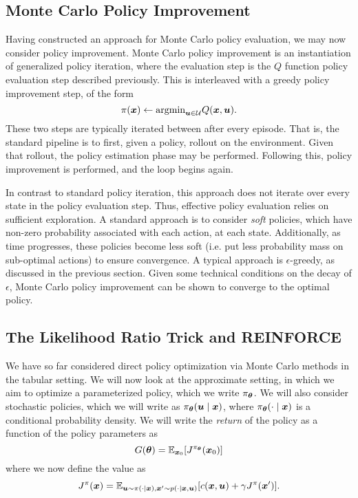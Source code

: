 \subsection{Monte Carlo Policy Improvement}

Having constructed an approach for Monte Carlo policy evaluation, we may now consider policy improvement. Monte Carlo policy improvement is an instantiation of generalized policy iteration, where the evaluation step is the $Q$ function policy evaluation step described previously. This is interleaved with a greedy policy improvement step, of the form
\begin{equation}
    \pi(\bm{x}) \gets \text{argmin}_{\bm{u}\in\mathcal{U}}Q(\bm{x},\bm{u}).
\end{equation}
These two steps are typically iterated between after every episode. That is, the standard pipeline is to first, given a policy, rollout on the environment. Given that rollout, the policy estimation phase may be performed. Following this, policy improvement is performed, and the loop begins again. 

In contrast to standard policy iteration, this approach does not iterate over every state in the policy evaluation step. Thus, effective policy evaluation relies on sufficient exploration. A standard approach is to consider \textit{soft} policies, which have non-zero probability associated with each action, at each state. Additionally, as time progresses, these policies become less soft (i.e. put less probability mass on sub-optimal actions) to ensure convergence. A typical approach is $\epsilon$-greedy, as discussed in the previous section. Given some technical conditions on the decay of $\epsilon$, Monte Carlo policy improvement can be shown to converge to the optimal policy. 


\subsection{The Likelihood Ratio Trick and REINFORCE}

We have so far considered direct policy optimization via Monte Carlo methods in the tabular setting. We will now look at the approximate setting, in which we aim to optimize a parameterized policy, which we write $\pi_{\bm{\theta}}$. We will also consider stochastic policies, which we will write as $\pi_{\bm{\theta}}(\bm{u}\mid\bm{x})$, where $\pi_{\bm{\theta}}(\cdot\mid\bm{x})$ is a conditional probability density. We will write the \textit{return} of the policy as a function of the policy parameters as 
\begin{equation}
    G(\bm{\theta}) = \mathbb{E}_{\bm{x}_0}[J^{\pi_{\bm{\theta}}}(\bm{x}_0)]
\end{equation}
where we now define the value as 
\begin{equation}
    J^{\pi}(\bm{x}) = \mathbb{E}_{\bm{u}\sim\pi(\cdot\mid\bm{x}), \bm{x}'\sim p(\cdot\mid\bm{x}, \bm{u})}[c(\bm{x},\bm{u}) + \gamma J^{\pi}(\bm{x}')].
\end{equation}


